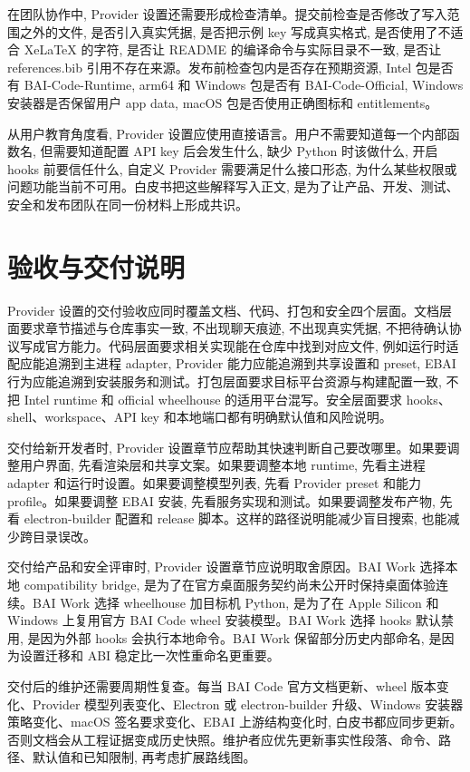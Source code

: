 在团队协作中, Provider 设置还需要形成检查清单。提交前检查是否修改了写入范围之外的文件, 是否引入真实凭据, 是否把示例 key 写成真实格式, 是否使用了不适合 XeLaTeX 的字符, 是否让 README 的编译命令与实际目录不一致, 是否让 references.bib 引用不存在来源。发布前检查包内是否存在预期资源, Intel 包是否有 BAI-Code-Runtime, arm64 和 Windows 包是否有 BAI-Code-Official, Windows 安装器是否保留用户 app data, macOS 包是否使用正确图标和 entitlements。

从用户教育角度看, Provider 设置应使用直接语言。用户不需要知道每一个内部函数名, 但需要知道配置 API key 后会发生什么, 缺少 Python 时该做什么, 开启 hooks 前要信任什么, 自定义 Provider 需要满足什么接口形态, 为什么某些权限或问题功能当前不可用。白皮书把这些解释写入正文, 是为了让产品、开发、测试、安全和发布团队在同一份材料上形成共识。

\section{验收与交付说明}
Provider 设置的交付验收应同时覆盖文档、代码、打包和安全四个层面。文档层面要求章节描述与仓库事实一致, 不出现聊天痕迹, 不出现真实凭据, 不把待确认协议写成官方能力。代码层面要求相关实现能在仓库中找到对应文件, 例如运行时适配应能追溯到主进程 adapter, Provider 能力应能追溯到共享设置和 preset, EBAI 行为应能追溯到安装服务和测试。打包层面要求目标平台资源与构建配置一致, 不把 Intel runtime 和 official wheelhouse 的适用平台混写。安全层面要求 hooks、shell、workspace、API key 和本地端口都有明确默认值和风险说明。

交付给新开发者时, Provider 设置章节应帮助其快速判断自己要改哪里。如果要调整用户界面, 先看渲染层和共享文案。如果要调整本地 runtime, 先看主进程 adapter 和运行时设置。如果要调整模型列表, 先看 Provider preset 和能力 profile。如果要调整 EBAI 安装, 先看服务实现和测试。如果要调整发布产物, 先看 electron-builder 配置和 release 脚本。这样的路径说明能减少盲目搜索, 也能减少跨目录误改。

交付给产品和安全评审时, Provider 设置章节应说明取舍原因。BAI Work 选择本地 compatibility bridge, 是为了在官方桌面服务契约尚未公开时保持桌面体验连续。BAI Work 选择 wheelhouse 加目标机 Python, 是为了在 Apple Silicon 和 Windows 上复用官方 BAI Code wheel 安装模型。BAI Work 选择 hooks 默认禁用, 是因为外部 hooks 会执行本地命令。BAI Work 保留部分历史内部命名, 是因为设置迁移和 ABI 稳定比一次性重命名更重要。

交付后的维护还需要周期性复查。每当 BAI Code 官方文档更新、wheel 版本变化、Provider 模型列表变化、Electron 或 electron-builder 升级、Windows 安装器策略变化、macOS 签名要求变化、EBAI 上游结构变化时, 白皮书都应同步更新。否则文档会从工程证据变成历史快照。维护者应优先更新事实性段落、命令、路径、默认值和已知限制, 再考虑扩展路线图。

